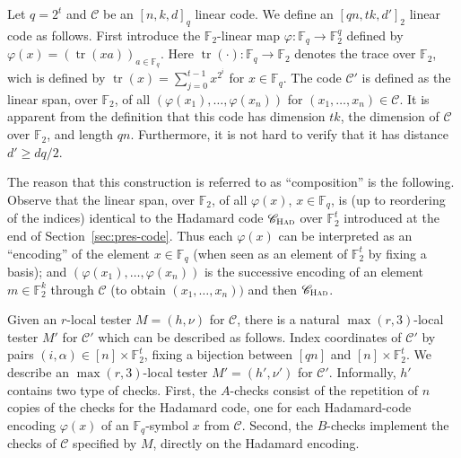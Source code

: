 \documentclass[11pt]{article}
\theoremstyle{definition}
\newcommand{\code}{\mathscr{C}}
\newcommand{\F}{\ensuremath{\mathbb{F}}}
\newcommand{\Had}{\ensuremath{\textsc{Had}}}
\DeclareMathOperator{\tr}{tr}
\begin{document}
Let $q=2^t$ and $\code$ be an $[n,k,d]_q$ linear code. We define an $[qn,tk,d']_2$ linear code as follows. First introduce the $\F_2$-linear map $\varphi:\F_q\to\F_2^q$ defined by $\varphi(x)=(\tr(xa))_{a\in \F_q}$. Here  $\tr(\cdot):\F_q\to\F_2$ denotes the trace over $\F_2$, wich is defined by $\tr(x) = \sum_{j=0}^{t-1} x^{2^i}$ for $x\in \F_q$. The code $\code'$ is defined as the linear span, over $\F_2$, of all $(\varphi(x_1),\ldots,\varphi(x_n))$ for $(x_1,\ldots,x_n)\in \code$. It is apparent from the definition that this code has dimension $tk$, the dimension of $\code$ over $\F_2$, and length $qn$. Furthermore, it is not hard to verify that it has distance $d'\geq dq/2$.

The reason that this construction is referred to as ``composition'' is the following. Observe that the linear span, over $\F_2$, of all $\varphi(x)$, $x\in \F_q$, is (up to reordering of the indices) identical to the Hadamard code $\code_\Had$ over $\F_2^t$ introduced at the end of Section~\ref{sec:pres-code}. Thus each $\varphi(x)$ can be interpreted as an ``encoding'' of the element $x\in \F_q$ (when seen as an element of $\F_2^t$ by fixing a basis); and  $(\varphi(x_1),\ldots,\varphi(x_n))$ is the successive encoding of an element $m\in\F_2^k$ through $\code$ (to obtain $(x_1,\ldots,x_n))$ and then $\code_\Had$.


%

Given an $r$-local tester $M=(h,\nu)$ for $\code$, there is a natural $\max(r,3)$-local tester $M'$ for $\code'$ which can be described as follows. Index coordinates of $\code'$ by pairs $(i,\alpha)\in [n]\times\F_2^t$, fixing a bijection between $[qn]$ and $[n]\times \F_2^t$.  We describe an $\max(r,3)$-local tester $M' = (h',\nu')$ for $\code'$. Informally, $h'$ contains two type of checks. First, the $A$-checks consist of the repetition of $n$ copies of the checks for the Hadamard code, one for each Hadamard-code encoding $\varphi(x)$ of an $\F_q$-symbol $x$ from $\code$. Second, the $B$-checks implement the checks of $\code$ specified by $M$, directly on the Hadamard encoding. 
\end{document}
